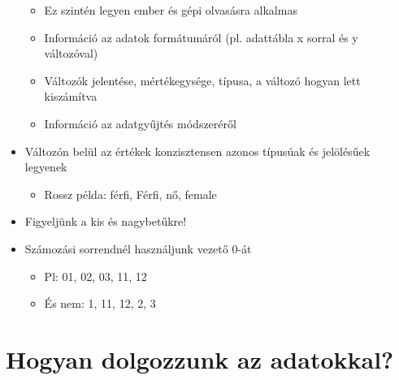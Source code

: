 \documentclass[
  letterpaper,
  DIV=11,
  numbers=noendperiod]{scrreprt}
\providecommand{\tightlist}{%
  \setlength{\itemsep}{0pt}\setlength{\parskip}{0pt}}\usepackage{longtable,booktabs,array}
\begin{document}
\begin{itemize}
  \begin{itemize}
  \item
    Ez szintén legyen ember és gépi olvasásra alkalmas
  \item
    Információ az adatok formátumáról (pl. adattábla x sorral és y
    változóval)
  \item
    Változók jelentése, mértékegysége, típusa, a változó hogyan lett
    kiszámítva
  \item
    Információ az adatgyűjtés módszeréről
  \end{itemize}
\item
  Változón belül az értékek konzisztensen azonos típusúak és jelölésűek
  legyenek

  \begin{itemize}
  \tightlist
  \item
    Rossz példa: férfi, Férfi, nő, female
  \end{itemize}
\item
  Figyeljünk a kis és nagybetűkre!
\item
  Számozási sorrendnél használjunk vezető 0-át

  \begin{itemize}
  \item
    Pl: 01, 02, 03, 11, 12
  \item
    És nem: 1, 11, 12, 2, 3
  \end{itemize}
\end{itemize}

\hypertarget{hogyan-dolgozzunk-az-adatokkal}{%
\section{Hogyan dolgozzunk az
adatokkal?}\label{hogyan-dolgozzunk-az-adatokkal}}
\end{document}

